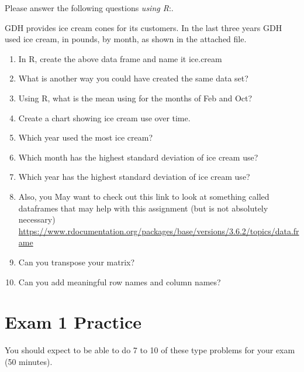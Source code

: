 \documentclass[
]{book}
\providecommand{\tightlist}{%
  \setlength{\itemsep}{0pt}\setlength{\parskip}{0pt}}
\begin{document}
Please answer the following questions \emph{using R}:.

GDH provides ice cream cones for its customers. In the last three years GDH used ice cream, in pounds, by month, as shown in the attached file.

\begin{enumerate}
\def\labelenumi{\arabic{enumi}.}
\tightlist
\item
  In R, create the above data frame and name it ice.cream
\item
  What is another way you could have created the same data set?
\item
  Using R, what is the mean using for the months of Feb and Oct?
\item
  Create a chart showing ice cream use over time.
\item
  Which year used the most ice cream?
\item
  Which month has the highest standard deviation of ice cream use?
\item
  Which year has the highest standard deviation of ice cream use?
\item
  Also, you May want to check out this link to look at something called dataframes that may help with this assignment (but is not absolutely necessary) \url{https://www.rdocumentation.org/packages/base/versions/3.6.2/topics/data.frame}
\item
  Can you transpose your matrix?
\item
  Can you add meaningful row names and column names?
\end{enumerate}

\hypertarget{exam-1-practice}{%
\chapter{Exam 1 Practice}\label{exam-1-practice}}

You should expect to be able to do 7 to 10 of these type problems for your exam (50 minutes).
\end{document}
